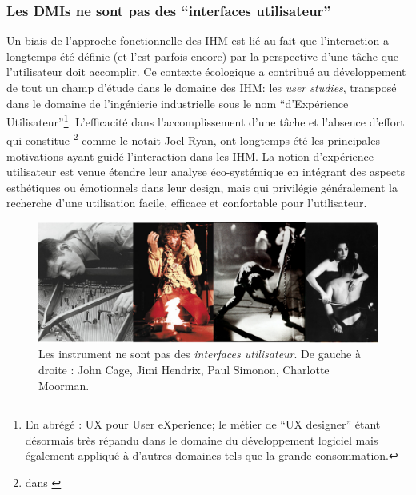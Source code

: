 \subsubsection{Les DMIs ne sont pas des ``interfaces utilisateur''}

\noindent Un biais de l'approche fonctionnelle des \gls{IHM} est lié au fait que l'interaction a longtemps été définie (et l'est parfois encore) par la perspective d'une tâche que l'utilisateur doit accomplir. Ce contexte écologique a contribué au développement de tout un champ d'étude dans le domaine des \gls{IHM}: les \textit{user studies}, transposé dans le domaine de l'ingénierie industrielle sous le nom ``d'Expérience Utilisateur''\footnote{En abrégé : UX pour User eXperience; le métier de ``UX designer'' étant désormais très répandu dans le domaine du développement logiciel mais également appliqué à d'autres domaines tels que la grande consommation.}. L'efficacité dans l'accomplissement d'une tâche et l'absence d'effort qui constitue \footnote{ dans \cite{ryan_remarks_1991}} comme le notait Joel Ryan, ont longtemps été les principales motivations ayant guidé l'interaction dans les \gls{IHM}. La notion d'expérience utilisateur est venue étendre leur analyse éco-systémique en intégrant des aspects esthétiques ou émotionnels dans leur design, mais qui privilégie généralement la recherche d'une utilisation facile, efficace et confortable pour l'utilisateur.\\
\begin{figure}[!htbp]
	\captionsetup{format=plain}%
	\includegraphics[width=\textwidth]{gfx/03_gesture/instrumentabusers.png}
	\caption[Les instrument ne sont pas des interfaces utilisateur]{Les instrument ne sont pas des \textit{interfaces utilisateur}. De gauche à droite : John Cage, Jimi Hendrix, Paul Simonon, Charlotte Moorman.}
	\label{fig:gesture:abusers}
\end{figure}
